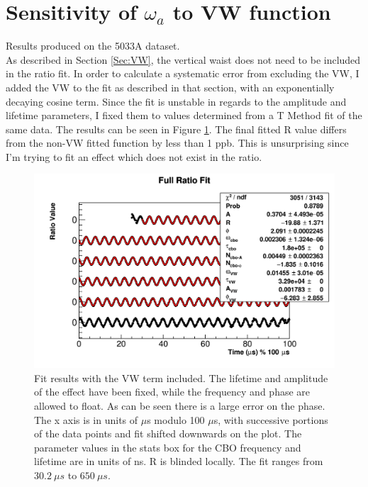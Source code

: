\section{Sensitivity of \texorpdfstring{$\omega_{a}$}{} to VW function}
\label{Sec:SystematicVW}

	Results produced on the 5033A dataset. \\

	As described in Section \ref{Sec:VW}, the vertical waist does not need to be included in the ratio fit. In order to calculate a systematic error from excluding the VW, I added the VW to the fit as described in that section, with an exponentially decaying cosine term. Since the fit is unstable in regards to the amplitude and lifetime parameters, I fixed them to values determined from a T Method fit of the same data. The results can be seen in Figure \ref{fig:VWModuloPlot}. The final fitted R value differs from the non-VW fitted function by less than 1 ppb. This is unsurprising since I'm trying to fit an effect which does not exist in the ratio.

	\begin{figure}[]
		\centering
		\includegraphics[width=\textwidth]{ratioCBO_moduloPlot-VW}
	    \caption[VWModuloPlot]{Fit results with the VW term included. The lifetime and amplitude of the effect have been fixed, while the frequency and phase are allowed to float. As can be seen there is a large error on the phase. The x axis is in units of $\mu$s modulo 100 $\mu$s, with successive portions of the data points and fit shifted downwards on the plot. The parameter values in the stats box for the CBO frequency and lifetime are in units of ns. R is blinded locally. The fit ranges from $\SI{30.2}{\mu s}$ to $\SI{650}{\mu s}$.}
	    \label{fig:VWModuloPlot}
	\end{figure}



